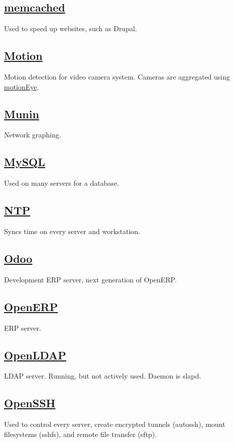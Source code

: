 \subsection{\href{http://www.memcached.org/}{memcached}}
Used to speed up websites, such as Drupal.

\subsection{\href{http://motion.sf.net}{Motion}}
Motion detection for video camera system. Cameras are aggregated
using \href{https://bitbucket.org/ccrisan/motioneye/wiki/Home}{motionEye}.

\subsection{\href{http://munin-monitoring.org/}{Munin}}
Network graphing.

\subsection{\href{http://www.mysql.org/}{MySQL}}
Used on many servers for a database.

\subsection{\href{http://support.ntp.org/}{NTP}}
Syncs time on every server and workstation.

\subsection{\href{http://www.odoo.com/}{Odoo}}
Development ERP server, next generation of OpenERP.

\subsection{\href{http://www.openerp.org/}{OpenERP}}
ERP server.

\subsection{\href{http://www.openldap.org/}{OpenLDAP}}
LDAP server. Running, but not actively used. Daemon is slapd.

\subsection{\href{http://www.openssh.com/}{OpenSSH}}
Used to control every server, create encrypted tunnels (autossh),
mount filesystems (sshfs), and remote file transfer (sftp).

